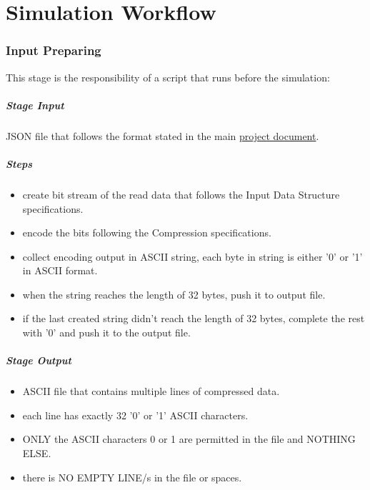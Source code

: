 \documentclass[12pt]{report}
\begin{document}
\part{Simulation Workflow}
\section{Input Preparing}
This stage is the responsibility of a script that runs before the simulation:
\subsubsection{Stage Input}
JSON file that follows the format stated in the main \href{https://docs.google.com/document/d/10A55BSsqfsHDiRTdhKYW2H_w3TB4mgXQe5GLBEdv4iM/edit}{project document}.

\subsubsection{Steps}
\begin{itemize}
    \item create bit stream of the read data that follows the {Input Data Structure} specifications.
    \item encode the bits following the {Compression} specifications.
    \item collect encoding output in ASCII string, each byte in string is either '0' or '1' in ASCII format.
    \item when the string reaches the length of 32 bytes, push it to output file.
    \item if the last created string didn't reach the length of 32 bytes, complete the rest with '0' and push it to the output file.    
\end{itemize}

\subsubsection{Stage Output}
\begin{itemize}
    \item ASCII file that contains multiple lines of compressed data.
    \item each line has exactly 32 '0' or '1' ASCII characters.
    \item ONLY the ASCII characters 0 or 1 are permitted in the file and NOTHING ELSE.
    \item there is NO EMPTY LINE/s in the file or spaces.
\end{itemize}
\end{document}
